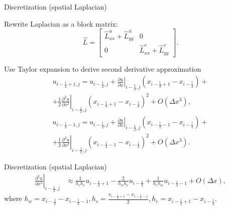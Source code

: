 \documentclass{beamer}
\begin{document}
	\begin{frame}{Discretization (spatial Laplacian)}
	
	Rewrite Laplacian as a block matrix:
	\begin{equation*}
		\hat L=
		\begin{bmatrix}
	  \hat{L}^u_{xx}+\hat{L}^u_{yy} & 0 \\
	  0 & \hat{L}^v_{xx}+\hat{L}^v_{yy}
	\end{bmatrix}.
	\end{equation*}
	
	Use Taylor expansion to derive second derivative approximation
	\begin{multline}\label{eqn:Taylor right} 
		u_{i-\frac{1}{2}+1,j}=u_{i-\frac{1}{2},j}+\left.\frac{\partial u}{\partial x}\right|_{i-\frac{1}{2},j}\left(x_{i-\frac{1}{2}+1}-x_{i-\frac{1}{2}}\right)+\\
		+\frac{1}{2}\left.\frac{\partial^2 u}{\partial x^2}\right|_{i-\frac{1}{2},j}\left(x_{i-\frac{1}{2}+1}-x_{i-\frac{1}{2}}\right)^2+O\left(\Delta x^3\right),
	\end{multline}
	\begin{multline}\label{eqn:Taylor left} 
		u_{i-\frac{1}{2}-1,j}=u_{i-\frac{1}{2},j}+\left.\frac{\partial u}{\partial x}\right|_{i-\frac{1}{2},j}\left(x_{i-\frac{1}{2}-1}-x_{i-\frac{1}{2}}\right)+\\
		+\frac{1}{2}\left.\frac{\partial^2 u}{\partial x^2}\right|_{i-\frac{1}{2},j}\left(x_{i-\frac{1}{2}-1}-x_{i-\frac{1}{2}}\right)^2+O\left(\Delta x^3\right).
	\end{multline}
	\end{frame}
	
	\begin{frame}{Discretization (spatial Laplacian)}
	\begin{align}\label{eqn:laplacian-discretization-non-uniform-dx}
	\left.\frac{\partial^2 u}{\partial x^2}\right|_{i-\frac{1}{2},j} & \approx \frac{1}{h_c h_e}u_{i-\frac{1}{2}+1} - \frac{2}{h_w h_e}u_{i-\frac{1}{2}} + \frac{1}{h_c h_w}u_{i-\frac{1}{2}-1} + O(\Delta x),
	\end{align}	
	where $h_w=x_{i-\frac{1}{2}}-x_{i-\frac{1}{2}-1},h_c = \frac{x_{i-\frac{1}{2}+1}-x_{i-\frac{1}{2}-1}}{2}, h_e = x_{i-\frac{1}{2}+1}-x_{i-\frac{1}{2}}$.
	\end{frame}
\end{document}
